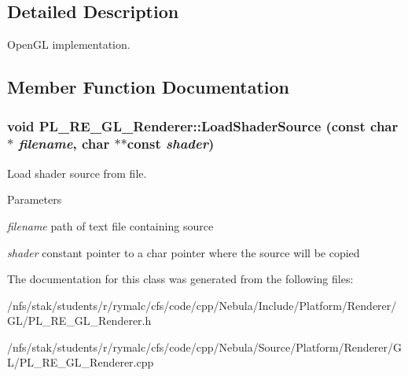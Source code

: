 \subsection{Detailed Description}
OpenGL implementation. 

\subsection{Member Function Documentation}
\hypertarget{classPlatform_1_1Renderer_1_1GL_1_1Renderer_ae1f1af7a87dc3f0e3e710dea0150c662}{
\subsubsection[{LoadShaderSource}]{\setlength{\rightskip}{0pt plus 5cm}void PL\_\-RE\_\-GL\_\-Renderer::LoadShaderSource (const char $\ast$ {\em filename}, \/  char $\ast$$\ast$const  {\em shader})}}
\label{classPlatform_1_1Renderer_1_1GL_1_1Renderer_ae1f1af7a87dc3f0e3e710dea0150c662}


Load shader source from file. 
\begin{DoxyParams}{Parameters}
\item[{\em filename}]path of text file containing source \item[{\em shader}]constant pointer to a char pointer where the source will be copied \end{DoxyParams}


The documentation for this class was generated from the following files:\begin{DoxyCompactItemize}
\item 
/nfs/stak/students/r/rymalc/cfs/code/cpp/Nebula/Include/Platform/Renderer/GL/PL\_\-RE\_\-GL\_\-Renderer.h\item 
/nfs/stak/students/r/rymalc/cfs/code/cpp/Nebula/Source/Platform/Renderer/GL/PL\_\-RE\_\-GL\_\-Renderer.cpp\end{DoxyCompactItemize}
